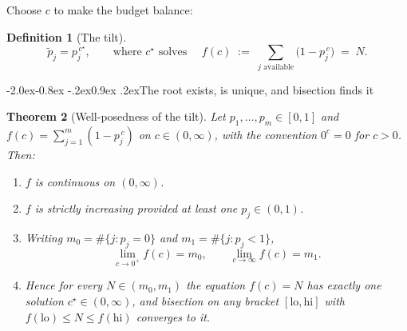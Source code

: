\documentclass[10pt,a4paper]{article}
\makeatletter
\theoremstyle{plain}
\newtheorem{theorem}{Theorem}[section]
\theoremstyle{definition}
\newtheorem{definition}[theorem]{Definition}
\theoremstyle{remark}
\newcommand{\lo}{\mathrm{lo}}
\renewcommand\subsection{\@startsection{subsection}{2}{\z@}%
  {-2.0ex\@plus -0.8ex \@minus -.2ex}{0.9ex \@plus .2ex}{\normalfont\large\bfseries}}
\makeatother
\begin{document}
Choose $c$ to make the budget balance:

\begin{definition}[The tilt]
\begin{equation}
\tilde p_j = p_j^{\,c^\star},
\qquad\text{where } c^\star \text{ solves }\quad
f(c) \;:=\; \sum_{j \text{ available}} \big(1 - p_j^{\,c}\big) \;=\; N.
\label{eq:tilt}
\end{equation}
\end{definition}

\subsection{The root exists, is unique, and bisection finds it}

\begin{theorem}[Well-posedness of the tilt]
\label{thm:tilt}
Let $p_1, \dots, p_m \in [0,1]$ and $f(c) = \sum_{j=1}^m (1 - p_j^{\,c})$ on $c \in
(0,\infty)$, with the convention $0^c = 0$ for $c>0$. Then:
\begin{enumerate}
\item[(i)] $f$ is continuous on $(0,\infty)$.
\item[(ii)] $f$ is strictly increasing provided at least one $p_j \in (0,1)$.
\item[(iii)] Writing $m_0 = \#\{j : p_j = 0\}$ and $m_1 = \#\{j : p_j < 1\}$,
\[
\lim_{c \to 0^+} f(c) = m_0, \qquad \lim_{c\to\infty} f(c) = m_1 .
\]
\item[(iv)] Hence for every $N \in (m_0, m_1)$ the equation $f(c) = N$ has exactly one
solution $c^\star \in (0,\infty)$, and bisection on any bracket $[\lo, \mathrm{hi}]$
with $f(\lo) \le N \le f(\mathrm{hi})$ converges to it.
\end{enumerate}
\end{theorem}
\end{document}
